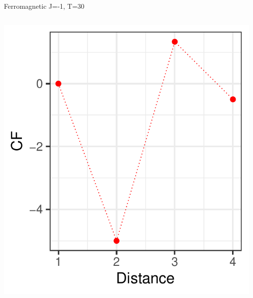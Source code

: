 \documentclass{beamer}
\begin{document}
\begin{frame}{Ferromagnetic J=-1, T=30}
\begin{columns}
\begin{column}{0.5\textwidth}
\begin{center}
     \includegraphics[width=\textwidth]{Pic/J-1_10_6000_T=30_CORRELATION.pdf}
     \end{center}
\end{column}
\end{columns}
\end{frame}
\end{document}
